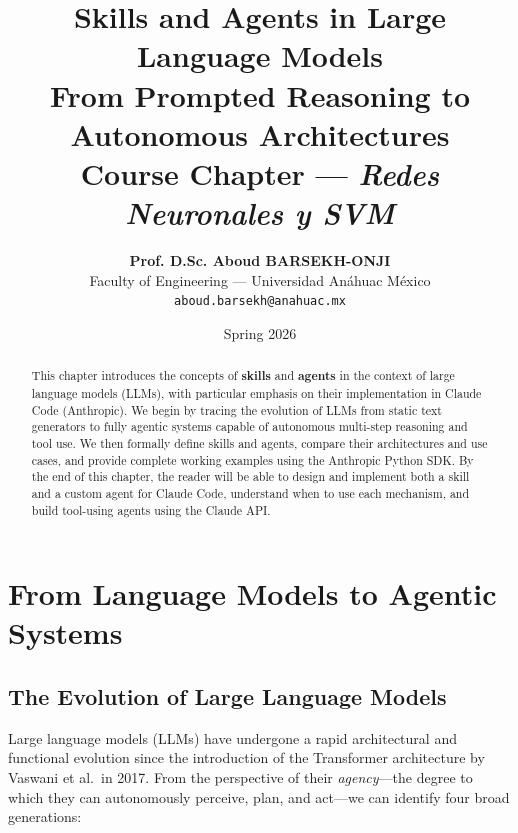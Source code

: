 \documentclass[11pt,letterpaper]{article}
\title{
    \LARGE \textbf{Skills and Agents in Large Language Models} \\[0.3cm]
    \large From Prompted Reasoning to Autonomous Architectures \\[0.5cm]
    \normalsize Course Chapter --- \textit{Redes Neuronales y SVM}
}
\author{
    \textbf{Prof. D.Sc. Aboud BARSEKH-ONJI} \\
    Faculty of Engineering --- Universidad Anáhuac México \\
    \texttt{aboud.barsekh@anahuac.mx}
}
\date{Spring 2026}
\begin{document}

\maketitle
\thispagestyle{fancy}

\begin{abstract}
This chapter introduces the concepts of \textbf{skills} and \textbf{agents} in the context of large language models (LLMs), with particular emphasis on their implementation in Claude Code (Anthropic). We begin by tracing the evolution of LLMs from static text generators to fully agentic systems capable of autonomous multi-step reasoning and tool use. We then formally define skills and agents, compare their architectures and use cases, and provide complete working examples using the Anthropic Python SDK. By the end of this chapter, the reader will be able to design and implement both a skill and a custom agent for Claude Code, understand when to use each mechanism, and build tool-using agents using the Claude API.
\end{abstract}

\tableofcontents
\newpage

\section{From Language Models to Agentic Systems}

\subsection{The Evolution of Large Language Models}

Large language models (LLMs) have undergone a rapid architectural and functional evolution since the introduction of the Transformer architecture by Vaswani et al.\ in 2017. From the perspective of their \emph{agency}---the degree to which they can autonomously perceive, plan, and act---we can identify four broad generations:
\end{document}
